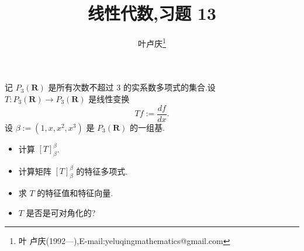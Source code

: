 ﻿\documentclass[a4paper]{article}
\begin{document}
\title{\huge{\bf{线性代数,习题 13}}} \author{\small{叶卢庆\footnote{叶
      卢庆(1992---),E-mail:yeluqingmathematics@gmail.com}}}
\maketitle\ni
\begin{exercise}
记 $P_3(\mathbf{R})$ 是所有次数不超过 $3$ 的实系数多项式的集合.设
$T:P_3(\mathbf{R})\to P_3(\mathbf{R})$ 是线性变换
$$
Tf:=\frac{df}{dx}.
$$
设 $\beta:=(1,x,x^2,x^3)$ 是 $P_3(\mathbf{R})$ 的一组基.
\begin{itemize}
\item 计算 $[T]_{\beta}^{\beta}$.
\item 计算矩阵 $[T]_{\beta}^{\beta}$ 的特征多项式.
\item 求 $T$ 的特征值和特征向量.
\item $T$ 是否是可对角化的?
\end{itemize}
\end{exercise}
\end{document}
